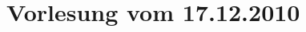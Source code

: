 \documentclass[12pt,oneside,a4paper,parskip=on,fleqn]{scrartcl}
\begin{document}
\section{Vorlesung vom 17.12.2010} %
\label{sec:vorlesung_vom_17_12_2010}
	
\end{document}
